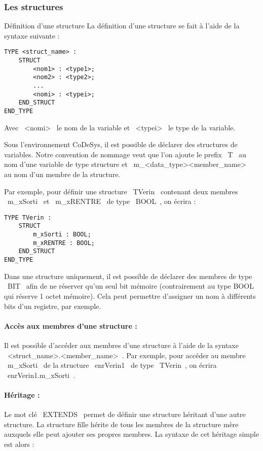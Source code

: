 \subsubsection{Les structures}
\begin{UPSTIinfor}{Définition d'une structure}
    La définition d'une structure se fait à l'aide de la syntaxe suivante : 
    \begin{lstlisting}[language=ST]
TYPE <struct_name> :
    STRUCT
        <nom1> : <type1>;
        <nom2> : <type2>;
        ...
        <nomi> : <typei>;
    END_STRUCT
END_TYPE\end{lstlisting}

    Avec ~<nomi>~ le nom de la variable et ~<typei>~ le type de la variable. 
\end{UPSTIinfor}
Sous l'environnement CoDeSys, il est possible de déclarer des structures de variables. 
Notre convention de nommage veut que l'on ajoute le prefix ~T~ au nom d'une variable de type structure et ~m_<data_type><member_name>~ au nom d'un membre de la structure.

Par exemple, pour définir une structure ~TVerin~ contenant deux membres ~m_xSorti~ et ~m_xRENTRE~ de type ~BOOL~, on écrira : 
\begin{lstlisting}[language=ST]
TYPE TVerin :
    STRUCT
        m_xSorti : BOOL;
        m_xRENTRE : BOOL;
    END_STRUCT
END_TYPE\end{lstlisting}

Dans une structure uniquement, il est possible de déclarer des membres de type ~BIT~ afin de ne réserver qu'un seul bit mémoire (contrairement au type BOOL qui réserve 1 octet mémoire). Cela peut permettre d'assigner un nom à différents bits d'un registre, par exemple. 

\paragraph{Accès aux membres d'une structure : }
Il est possible d'accéder aux membres d'une structure à l'aide de la syntaxe ~<struct_name>.<member_name>~. Par exemple, pour accéder au membre ~m_xSorti~ de la structure ~enrVerin1~ de type ~TVerin~, on écrira ~enrVerin1.m_xSorti~.


\paragraph{Héritage : }
Le mot clé ~EXTENDS~ permet de définir une structure héritant d'une autre structure. La structure fille hérite de tous les membres de la structure mère auxquels elle peut ajouter ses propres membres. La syntaxe de cet héritage simple est alors : 


